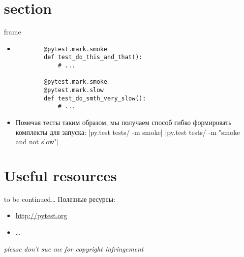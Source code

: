 \documentclass{beamer}
\begin{document}
\section{section}
\begin{frame}[fragile]{frame}
    \begin{itemize}
    \pause \item 
        \begin{verbatim}
        @pytest.mark.smoke
        def test_do_this_and_that():
            # ...

        @pytest.mark.smoke
        @pytest.mark.slow
        def test_do_smth_very_slow():
            # ...
        \end{verbatim}
    \pause \item Помечая тесты таким образом, мы получаем способ гибко формировать комплекты для запуска:
        |py.test tests/ -m smoke|
        |py.test tests/ -m "smoke and not slow"|
    \end{itemize}
\end{frame}

\section{Useful resources}
\begin{frame}[fragile]{to be continued\ldots}
    Полезные ресурсы:
    \begin{itemize}
    \item \url{http://pytest.org}
    \item \ldots
    \end{itemize}
    \footnotesize\emph{please don't sue me for copyright infringement}
\end{frame}
\end{document}
